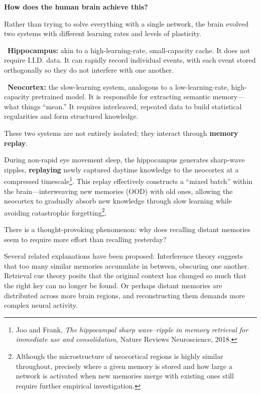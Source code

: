 \vspace{0.8em}

\textbf{How does the human brain achieve this?}

Rather than trying to solve everything with a single network, the brain evolved two systems with different learning rates and levels of plasticity.

\textbullet~\textbf{Hippocampus:} akin to a high-learning-rate, small-capacity cache. It does not require I.I.D. data. It can rapidly record individual events, with each event stored orthogonally so they do not interfere with one another.

\textbullet~\textbf{Neocortex:} the slow-learning system, analogous to a low-learning-rate, high-capacity pretrained model. It is responsible for extracting semantic memory---what things ``mean.'' It requires interleaved, repeated data to build statistical regularities and form structured knowledge.

\vspace{0.8em}

These two systems are not entirely isolated; they interact through \textbf{memory replay}.

During non-rapid eye movement sleep, the hippocampus generates sharp-wave ripples, \textbf{replaying} newly captured daytime knowledge to the neocortex at a compressed timescale\footnote{Joo and Frank, \textit{The hippocampal sharp wave--ripple in memory retrieval for immediate use and consolidation}, Nature Reviews Neuroscience, 2018.}. This replay effectively constructs a ``mixed batch'' within the brain---interweaving new memories (OOD) with old ones, allowing the neocortex to gradually absorb new knowledge through slow learning while avoiding catastrophic forgetting\footnote{Although the microstructure of neocortical regions is highly similar throughout, precisely where a given memory is stored and how large a network is activated when new memories merge with existing ones still require further empirical investigation.}.


\vspace{1em}

There is a thought-provoking phenomenon: why does recalling distant memories seem to require more effort than recalling yesterday?

Several related explanations have been proposed:
Interference theory suggests that too many similar memories accumulate in between, obscuring one another.
Retrieval cue theory posits that the original context has changed so much that the right key can no longer be found.
Or perhaps distant memories are distributed across more brain regions, and reconstructing them demands more complex neural activity.

